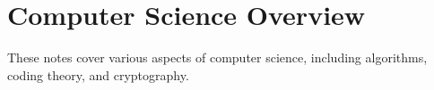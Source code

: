 \chapter{Computer Science Overview}
These notes cover various aspects of computer science, including algorithms, coding theory, and cryptography.
